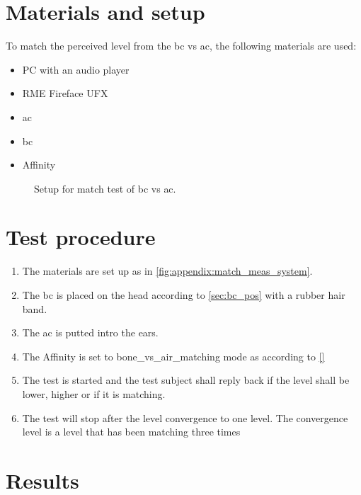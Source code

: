 \section*{Materials and setup}
To match the perceived level from the \gls{bc} vs \gls{ac}, the following materials are used:
\begin{itemize}
\item PC with an audio player
\item RME Fireface UFX
\item \gls{ac}
\item \gls{bc}
\item Affinity
\end{itemize}

\begin{figure}[H]
\centering
\def\svgwidth{\columnwidth}

\caption{Setup for match test of \gls{bc} vs \gls{ac}.}
		\label{fig:appendix:match_meas_system}
\end{figure}

\section*{Test procedure}


\begin{enumerate}
\item The materials are set up as in \autoref{fig:appendix:match_meas_system}.
\item The \gls{bc} is placed on the head according to \autoref{sec:bc_pos} with a rubber hair band.
\item The \gls{ac} is putted intro the ears.
\item The Affinity is set to bone_vs_air_matching mode as according to \autoref{} 
\item The test is started and the test subject shall reply back if the level shall be lower, higher or if it is matching. 
\item The test will stop after the level convergence to one level. The convergence level is a level that has been matching three times 
\end{enumerate}

\section*{Results}

